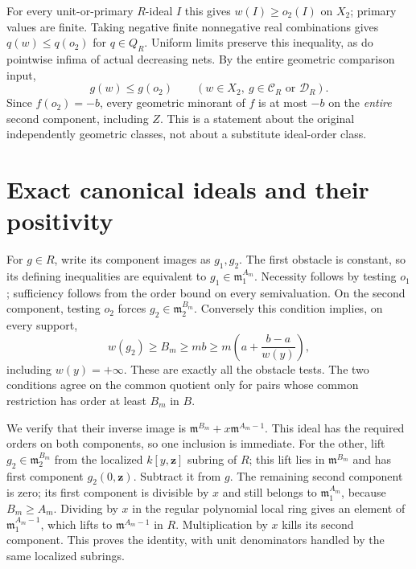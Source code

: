 \documentclass[11pt]{article}
\newcommand{\m}{\mathfrak m}
\newcommand{\C}{\mathcal C}
\newcommand{\D}{\mathcal D}
\begin{document}
For every unit-or-primary \(R\)-ideal \(I\) this gives
\(w(I)\geq o_2(I)\) on \(X_2\); primary values are finite.
Taking negative finite nonnegative real combinations gives
\(q(w)\leq q(o_2)\) for \(q\in Q_R\).
Uniform limits preserve this inequality, as do pointwise infima of
actual decreasing nets. By the entire geometric comparison input,
\[
 g(w)\leq g(o_2)\qquad(w\in X_2,\ g\in\C_R\text{ or }\D_R).
\]
Since \(f(o_2)=-b\), every geometric minorant of \(f\) is at most
\(-b\) on the \emph{entire} second component, including \(Z\).
This is a statement about the original independently geometric classes,
not about a substitute ideal-order class.

\section{Exact canonical ideals and their positivity}

For \(g\in R\), write its component images as \(g_1,g_2\).
The first obstacle is constant, so its defining inequalities are equivalent to
\(g_1\in\m_1^{A_m}\). Necessity follows by testing \(o_1\);
sufficiency follows from the order bound on every semivaluation.
On the second component, testing \(o_2\) forces
\(g_2\in\m_2^{B_m}\). Conversely this condition implies, on every support,
\[
 w(g_2)\geq B_m\geq mb\geq
     m\left(a+\frac{b-a}{w(y)}\right),
\]
including \(w(y)=+\infty\). These are exactly all the obstacle tests.
The two conditions agree on the common quotient only for pairs whose
common restriction has order at least \(B_m\) in \(B\).

We verify that their inverse image is \(\m^{B_m}+x\m^{A_m-1}\).
This ideal has the required orders on both components, so one inclusion
is immediate. For the other, lift \(g_2\in\m_2^{B_m}\) from
the localized \(k[y,\mathbf z]\) subring of \(R\); this lift lies
in \(\m^{B_m}\) and has first component \(g_2(0,\mathbf z)\).
Subtract it from \(g\). The remaining second component is zero;
its first component is divisible by \(x\) and still belongs to
\(\m_1^{A_m}\), because \(B_m\geq A_m\).
Dividing by \(x\) in the regular polynomial local ring gives an
element of \(\m_1^{A_m-1}\), which lifts to
\(\m^{A_m-1}\) in \(R\). Multiplication by \(x\) kills its
second component. This proves the identity, with unit denominators
handled by the same localized subrings.
\end{document}
